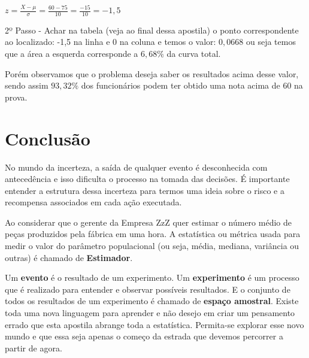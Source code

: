 \documentclass[a4paper,11pt]{article}
\begin{document}
$z = \frac{X - \mu}{\sigma} = \frac{60 - 75}{10} = \frac{-15}{10} = -1,5$

2º Passo - Achar na tabela (veja ao final dessa apostila) o ponto correspondente ao localizado: -1,5 na linha e 0 na coluna e temos o valor: $0,0668$ ou seja temos que a área a esquerda corresponde a $6,68\%$ da curva total. 

Porém observamos que o problema deseja saber os resultados acima desse valor, sendo assim $93,32\%$ dos funcionários podem ter obtido uma nota acima de 60 na prova.

\section{Conclusão}
No mundo da incerteza, a saída de qualquer evento é desconhecida com antecedência e isso dificulta o processo na tomada das decisões. É importante entender a estrutura dessa incerteza para termos uma ideia sobre o risco e a recompensa associados em cada ação executada. 

Ao considerar que o gerente da Empresa ZzZ quer estimar o número médio de peças produzidos pela fábrica em uma hora. A estatística ou métrica usada para medir o valor do parâmetro populacional (ou seja, média, mediana, variância ou outras) é chamado de \textbf{Estimador}.

Um \textbf{evento} é o resultado de um experimento. Um \textbf{experimento} é um processo que é realizado para entender e observar possíveis resultados. E o conjunto de todos os resultados de um experimento é chamado de \textbf{espaço amostral}. Existe toda uma nova linguagem para aprender e não desejo em criar um pensamento errado que esta apostila abrange toda a estatística. Permita-se explorar esse novo mundo e que essa seja apenas o começo da estrada que devemos percorrer a partir de agora. 




\begin{thebibliography}{3}
		
\end{thebibliography}
\end{document}
